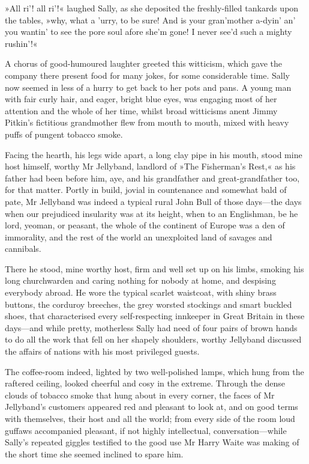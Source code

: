 »All ri'! all ri'!« laughed Sally, as she deposited the freshly-filled tankards upon the tables, »why, what a 'urry, to be sure! And is your gran'mother a-dyin' an' you wantin' to see the pore soul afore she'm gone! I never see'd such a mighty rushin'!«

A chorus of good-humoured laughter greeted this witticism, which gave the company there present food for many jokes, for some considerable time. Sally now seemed in less of a hurry to get back to her pots and pans. A young man with fair curly hair, and eager, bright blue eyes, was engaging most of her attention and the whole of her time, whilst broad witticisms anent Jimmy Pitkin's fictitious grandmother flew from mouth to mouth, mixed with heavy puffs of pungent tobacco smoke.

Facing the hearth, his legs wide apart, a long clay pipe in his mouth, stood mine host himself, worthy Mr Jellyband, landlord of »The Fisherman's Rest,« as his father had been before him, aye, and his grandfather and great-grandfather too, for that matter. Portly in build, jovial in countenance and somewhat bald of pate, Mr Jellyband was indeed a typical rural John Bull of those days\allowbreak---\allowbreak the days when our prejudiced insularity was at its height, when to an Englishman, be he lord, yeoman, or peasant, the whole of the continent of Europe was a den of immorality, and the rest of the world an unexploited land of savages and cannibals.

There he stood, mine worthy host, firm and well set up on his limbs, smoking his long churchwarden and caring nothing for nobody at home, and despising everybody abroad. He wore the typical scarlet waistcoat, with shiny brass buttons, the corduroy breeches, the grey worsted stockings and smart buckled shoes, that characterised every self-respecting innkeeper in Great Britain in these days\allowbreak---\allowbreak and while pretty, motherless Sally had need of four pairs of brown hands to do all the work that fell on her shapely shoulders, worthy Jellyband discussed the affairs of nations with his most privileged guests.

The coffee-room indeed, lighted by two well-polished lamps, which hung from the raftered ceiling, looked cheerful and cosy in the extreme. Through the dense clouds of tobacco smoke that hung about in every corner, the faces of Mr Jellyband's customers appeared red and pleasant to look at, and on good terms with themselves, their host and all the world; from every side of the room loud guffaws accompanied pleasant, if not highly intellectual, conversation\allowbreak---\allowbreak while Sally's repeated giggles testified to the good use Mr Harry Waite was making of the short time she seemed inclined to spare him.

